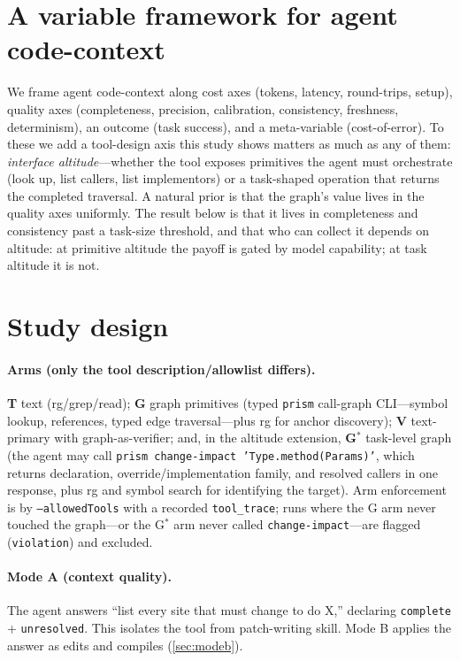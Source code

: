 \documentclass[11pt]{article}
\newcommand{\code}[1]{\texttt{#1}}
\newcommand{\gstar}{G$^{*}$}
\begin{document}
\section{A variable framework for agent code-context}
\label{sec:framework}

We frame agent code-context along cost axes (tokens, latency, round-trips,
setup), quality axes (completeness, precision, calibration, consistency,
freshness, determinism), an outcome (task success), and a meta-variable
(cost-of-error). To these we add a tool-design axis this study shows matters as
much as any of them: \emph{interface altitude}---whether the tool exposes
primitives the agent must orchestrate (look up, list callers, list
implementors) or a task-shaped operation that returns the completed traversal.
A natural prior is that the graph's value lives in the quality axes
uniformly. The result below is that it lives in completeness and consistency
past a task-size threshold, and that who can collect it depends on altitude: at
primitive altitude the payoff is gated by model capability; at task altitude it
is not.

\section{Study design}
\label{sec:design}

\paragraph{Arms (only the tool description/allowlist differs).}
\textbf{T} text (rg/grep/read); \textbf{G} graph primitives (typed \code{prism}
call-graph CLI---symbol lookup, references, typed edge traversal---plus rg for
anchor discovery); \textbf{V} text-primary with graph-as-verifier; and, in the
altitude extension, \textbf{\gstar{}} task-level graph (the agent may call
\code{prism change-impact 'Type.method(Params)'}, which returns declaration,
override/implementation family, and resolved callers in one response, plus rg
and symbol search for identifying the target). Arm enforcement is by
\code{--allowedTools} with a recorded \code{tool\_trace}; runs where the G arm
never touched the graph---or the \gstar{} arm never called
\code{change-impact}---are flagged (\code{violation}) and excluded.

\paragraph{Mode A (context quality).}
The agent answers ``list every site that must change to do X,'' declaring
\code{complete} + \code{unresolved}. This isolates the tool from patch-writing
skill. Mode B applies the answer as edits and compiles (\cref{sec:modeb}).
\end{document}
